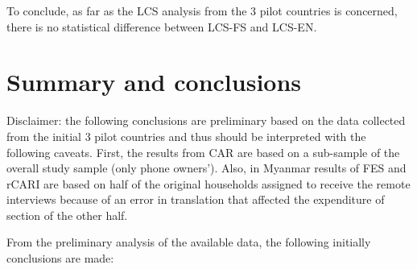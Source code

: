 \documentclass[11pt,harvard]{article}
\begin{document}
To conclude, as far as the LCS analysis from the 3 pilot countries is concerned, there is no statistical difference between LCS-FS and LCS-EN.


\pagebreak


\section{Summary and conclusions}

Disclaimer: the following conclusions are preliminary based on the data collected from the initial 3 pilot countries and thus should be interpreted with the following caveats. First, the results from CAR are based on a sub-sample of the overall study sample (only phone owners’). Also, in Myanmar results of FES and rCARI are based on half of the original households assigned to receive the remote interviews because of an error in translation that affected the expenditure of section of the other half. 

From the preliminary analysis of the available data, the following initially conclusions are made: 
\end{document}

